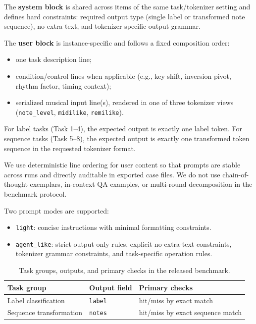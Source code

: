 \documentclass{article}
\begin{document}
The \textbf{system block} is shared across items of the same task/tokenizer setting and defines hard constraints: required output type (single label or transformed note sequence), no extra text, and tokenizer-specific output grammar.

The \textbf{user block} is instance-specific and follows a fixed composition order:
\begin{itemize}
    \item one task description line;
    \item condition/control lines when applicable (e.g., key shift, inversion pivot, rhythm factor, timing context);
    \item serialized musical input line(s), rendered in one of three tokenizer views (\texttt{note\_level}, \texttt{midilike}, \texttt{remilike}).
\end{itemize}

For label tasks (Task 1--4), the expected output is exactly one label token. For sequence tasks (Task 5--8), the expected output is exactly one transformed token sequence in the requested tokenizer format.

We use deterministic line ordering for user content so that prompts are stable across runs and directly auditable in exported case files. We do not use chain-of-thought exemplars, in-context QA examples, or multi-round decomposition in the benchmark protocol.

Two prompt modes are supported:
\begin{itemize}
    \item \texttt{light}: concise instructions with minimal formatting constraints.
    \item \texttt{agent\_like}: strict output-only rules, explicit no-extra-text constraints, tokenizer grammar constraints, and task-specific operation rules.
\end{itemize}

\begin{table}[hb]
  \centering
  \caption{Task groups, outputs, and primary checks in the released benchmark.}
  \label{tab:tasks}
  \begin{tabular}{p{}p{}p{}}
    \toprule
    Task group & Output field & Primary checks \\
    \midrule
    Label classification & \texttt{label} & hit/miss by exact match \\
    Sequence transformation & \texttt{notes} & hit/miss by exact sequence match \\
    \bottomrule
  \end{tabular}
\end{table}
\end{document}
